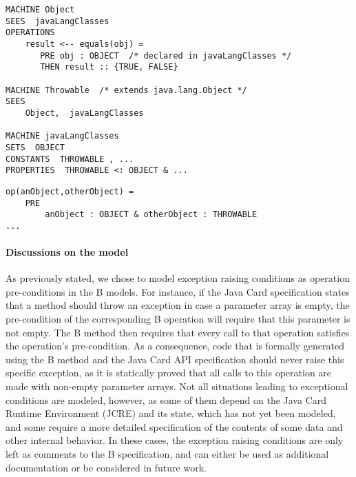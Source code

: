\documentclass{llncs}
\begin{document}
\begin{lstlisting}
MACHINE Object
SEES  javaLangClasses 
OPERATIONS
 	result <-- equals(obj) =
	   PRE obj : OBJECT  /* declared in javaLangClasses */
	   THEN result :: {TRUE, FALSE}

MACHINE Throwable  /* extends java.lang.Object */
SEES
    Object,  javaLangClasses 

MACHINE javaLangClasses
SETS  OBJECT   
CONSTANTS  THROWABLE , ...			
PROPERTIES  THROWABLE <: OBJECT & ...
\end{lstlisting}

\begin{lstlisting}
op(anObject,otherObject) = 
	PRE	
		anObject : OBJECT & otherObject : THROWABLE
...
\end{lstlisting}

\paragraph{Discussions on the model}
As previously stated, we chose to model exception raising conditions
as operation pre-conditions in the B models. For instance, if the Java
Card specification states that a method should throw an exception in
case a parameter array is empty, the pre-condition of the
corresponding B operation will require that this parameter is not
empty. The B method then requires that every call to that operation
satisfies the operation's pre-condition. As a consequence, code that
is formally generated using the B method and the Java Card API
specification should never raise this specific exception, as it is
statically proved that all calls to this operation are made with
non-empty parameter arrays. Not all situations leading to exceptional
conditions are modeled, however, as some of them depend on the Java
Card Runtime Environment (JCRE) and its state, which has not yet been
modeled, and some require a more detailed specification of the
contents of some data and other internal behavior. In these cases, the
exception raising conditions are only left as comments to the B
specification, and can either be used as additional documentation or be
considered in future work.
\end{document}
